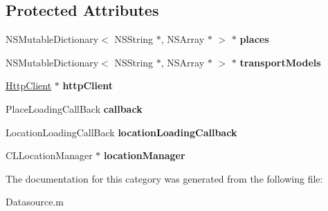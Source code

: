 \subsection*{Protected Attributes}
\begin{DoxyCompactItemize}
\item 
N\+S\+Mutable\+Dictionary$<$ N\+S\+String $\ast$, N\+S\+Array $\ast$ $>$ $\ast$ {\bfseries places}\hypertarget{category_datasource_07_08_a20e3efb3ddf701b6abc5389dea556fc2}{}\label{category_datasource_07_08_a20e3efb3ddf701b6abc5389dea556fc2}

\item 
N\+S\+Mutable\+Dictionary$<$ N\+S\+String $\ast$, N\+S\+Array $\ast$ $>$ $\ast$ {\bfseries transport\+Models}\hypertarget{category_datasource_07_08_af1cd049a695a5e8e78b0bcd0ead24d53}{}\label{category_datasource_07_08_af1cd049a695a5e8e78b0bcd0ead24d53}

\item 
\hyperlink{interface_http_client}{Http\+Client} $\ast$ {\bfseries http\+Client}\hypertarget{category_datasource_07_08_a22df64bcce5c95cf6e6d0c574d849210}{}\label{category_datasource_07_08_a22df64bcce5c95cf6e6d0c574d849210}

\item 
Place\+Loading\+Call\+Back {\bfseries callback}\hypertarget{category_datasource_07_08_a734b2e16b93f334f0b36e2ba79aa2ed9}{}\label{category_datasource_07_08_a734b2e16b93f334f0b36e2ba79aa2ed9}

\item 
Location\+Loading\+Call\+Back {\bfseries location\+Loading\+Callback}\hypertarget{category_datasource_07_08_a7c406566f0bad608980565915f6dbd45}{}\label{category_datasource_07_08_a7c406566f0bad608980565915f6dbd45}

\item 
C\+L\+Location\+Manager $\ast$ {\bfseries location\+Manager}\hypertarget{category_datasource_07_08_afe494fa7632db1e26817cff78810ba04}{}\label{category_datasource_07_08_afe494fa7632db1e26817cff78810ba04}

\end{DoxyCompactItemize}


The documentation for this category was generated from the following file\+:\begin{DoxyCompactItemize}
\item 
Datasource.\+m\end{DoxyCompactItemize}
